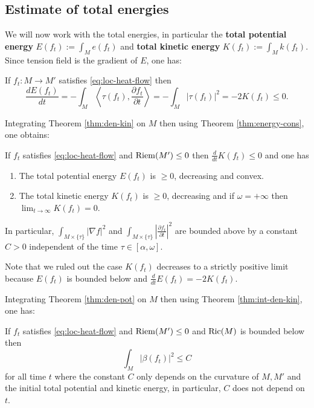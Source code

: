 \subsection{Estimate of total energies}
\label{sec:org6e59536}

We will now work with the total energies, in particular the \textbf{total potential energy} \(E(f_t) := \int_M e(f_t)\) and \textbf{total kinetic energy} \(K(f_t) := \int_M k(f_t)\). Since
tension field is the gradient of \(E\), one has:

\begin{theorem}
\label{thm:energy-cons}
If \(f_t: M \longrightarrow  M'\) satisfies \eqref{eq:loc-heat-flow} then
\[
 \frac{d E(f_t)}{dt} = -\int_M \left\langle \tau(f_t), \frac{\partial f_t}{\partial t}
\right \rangle = -\int_M |\tau(f_t)|^2 = -2K(f_t) \leq 0.
\]
\end{theorem}

Integrating Theorem \ref{thm:den-kin} on \(M\) then using Theorem \ref{thm:energy-cons}, one obtains:

\begin{theorem}
\label{thm:int-den-kin}
If \(f_t\) satisfies \eqref{eq:loc-heat-flow} and \(\mathop{\rm Riem}\nolimits(M')\leq 0\) then \(\frac{d
}{dt}K(f_t) \leq 0\) and one has
\begin{enumerate}
\item The total potential energy \(E(f_t)\) is \(\geq 0\), decreasing and convex.
\item The total kinetic energy \(K(f_t)\) is \(\geq 0\), decreasing and if \(\omega =
   +\infty\) then \(\lim_{t\to\infty} K(f_t) = 0\).
\end{enumerate}
In particular, \(\int_{M\times \{\tau\}} |\nabla f|^2\) and \(\int_{M\times\{\tau\}} \left|
\frac{\partial f_t}{\partial t} \right|^2\) are bounded above by a constant \(C>0\)
independent of the time \(\tau \in[\alpha,\omega]\).
\end{theorem}
Note that we ruled out the case \(K(f_t)\) decreases to a strictly positive limit
because \(E(f_t)\) is bounded below and \(\frac{d }{d t} E(f_t) = -2K(f_t)\).


Integrating Theorem \ref{thm:den-pot} on \(M\) then using Theorem \ref{thm:int-den-kin}, one has:

\begin{theorem}
\label{thm:int-den-pot}
If \(f_t\) satisfies \eqref{eq:loc-heat-flow} and \(\mathop{\rm Riem}\nolimits(M')\leq 0\) and \(\mathop{\rm Ric}\nolimits(M)\)
is bounded below then 
\[
\int_M |\beta(f_t)|^2 \leq C
\]
for all time \(t\) where the constant \(C\) only depends on the curvature of \(M, M'\) and the initial total potential and kinetic energy, in particular, \(C\) does not depend on \(t\).
\end{theorem}

